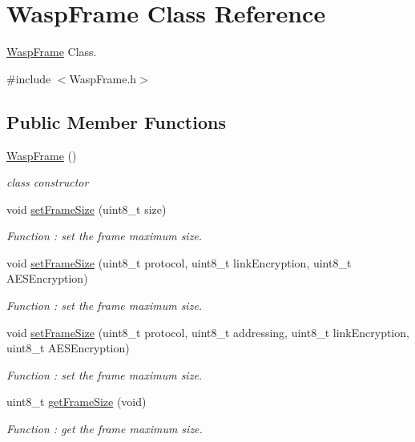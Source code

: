 \hypertarget{class_wasp_frame}{}\section{Wasp\+Frame Class Reference}
\label{class_wasp_frame}


\hyperlink{class_wasp_frame}{Wasp\+Frame} Class.  




{\ttfamily \#include $<$Wasp\+Frame.\+h$>$}

\subsection*{Public Member Functions}
\begin{DoxyCompactItemize}
\item 
\hyperlink{class_wasp_frame_ac3e1f27f05dbf1ce26f5955bdfc3a56a}{Wasp\+Frame} ()
\begin{DoxyCompactList}\small\item\em class constructor \end{DoxyCompactList}\item 
void \hyperlink{class_wasp_frame_a47ddf440ea4ef74d406f1233b8dd2576}{set\+Frame\+Size} (uint8\+\_\+t size)
\begin{DoxyCompactList}\small\item\em Function \+: set the frame maximum size. \end{DoxyCompactList}\item 
void \hyperlink{class_wasp_frame_a9541d92cf2093307e73117870f435619}{set\+Frame\+Size} (uint8\+\_\+t protocol, uint8\+\_\+t link\+Encryption, uint8\+\_\+t A\+E\+S\+Encryption)
\begin{DoxyCompactList}\small\item\em Function \+: set the frame maximum size. \end{DoxyCompactList}\item 
void \hyperlink{class_wasp_frame_aba2fd4916e78117d11b5ac7f68f4c50b}{set\+Frame\+Size} (uint8\+\_\+t protocol, uint8\+\_\+t addressing, uint8\+\_\+t link\+Encryption, uint8\+\_\+t A\+E\+S\+Encryption)
\begin{DoxyCompactList}\small\item\em Function \+: set the frame maximum size. \end{DoxyCompactList}\item 
uint8\+\_\+t \hyperlink{class_wasp_frame_abf0862100b36d8a9523b4733cbd7298b}{get\+Frame\+Size} (void)
\begin{DoxyCompactList}\small\item\em Function \+: get the frame maximum size. \end{DoxyCompactList}\item 

\end{DoxyCompactItemize}
